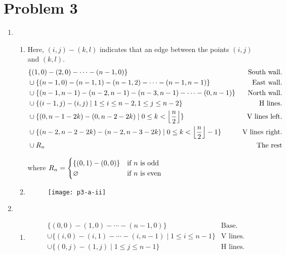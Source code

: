 \documentclass[12pt,a4paper]{article}
\begin{document}
\section*{Problem 3}
	\begin{enumerate}
		\item 
		\begin{enumerate}[label=(\roman*)]
			\item 
			Here, $(i, j) - (k, l)$ indicates that an edge between the points $(i, j)$ and $(k, l)$.
			\begin{align*}
				&\{(1, 0) - (2, 0) - \cdots - (n-1, 0)\}
					&\text{South wall.} \\
				&\cup \{(n-1, 0) - (n-1, 1) - (n-1, 2) - \cdots - (n-1, n-1)\}
					&\text{East wall.} \\
				&\cup \{(n-1, n-1) - (n - 2, n-1) - (n - 3, n-1) - \cdots - (0, n-1)\}
					&\text{North wall.} \\
				&\cup \{(i-1, j) - (i, j) \mid 1 \le i \le n - 2, 1 \le j \le n - 2\}
					&\text{H lines.} \\
				&\cup \{(0, n - 1 - 2k) - (0, n - 2 - 2k) \mid 0 \le k < \floor*{\frac{n}{2}}\}
					&\text{V lines left.} \\
				&\cup \{(n - 2, n - 2 - 2k) - (n - 2, n - 3 - 2k) \mid 0 \le k < \floor*{\frac{n}{2}} - 1\}
					&\text{V lines right.} \\
				&\cup R_n
					&\text{The rest} \\
			\end{align*}

			where
				$
				R_n = 
				\begin{cases}
					\{(0, 1) - (0, 0)\} & \text{if } n \text{ is odd} \\
					\o & \text{if } n \text{ is even}
				\end{cases}
				$

			\item \-
			\begin{figure}[H]
				\texttt{[image: p3-a-ii]}
				\centering
			\end{figure}

		\end{enumerate}

		\item 
		\begin{enumerate}[label=(\roman*)]
			\item 
			\begin{align*}
				&\{(0, 0) - (1, 0) - \cdots - (n-1, 0)\}
					&\text{Base.} \\
				&\cup \{(i, 0) - (i, 1) - \cdots - (i, n-1) \mid 1 \le i \le n - 1\}
					&\text{V lines.} \\
				&\cup \{(0, j) - (1, j) \mid 1 \le j \le n - 1\}
					&\text{H lines.} \\
			\end{align*}


\end{enumerate}
\end{enumerate}
\end{document}
